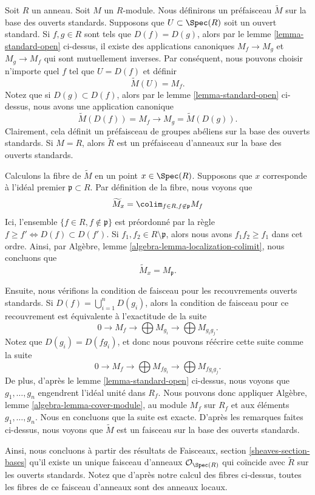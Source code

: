 \noindent
Soit $R$ un anneau. Soit $M$ un $R$-module. Nous définirons un préfaisceau
$\widetilde M$ sur la base des ouverts standards. Supposons que
$U \subset \Spec(R)$ soit un ouvert standard. Si $f, g \in R$
sont tels que $D(f) = D(g)$, alors par le lemme
\ref{lemma-standard-open} ci-dessus, il existe des applications canoniques $M_f
\to M_g$ et $M_g \to M_f$ qui sont mutuellement inverses. Par conséquent,
nous pouvons choisir n'importe quel $f$ tel que $U = D(f)$
et définir
$$
\widetilde M(U) = M_f.
$$
Notez que si $D(g) \subset D(f)$, alors par le lemme
\ref{lemma-standard-open} ci-dessus, nous avons une
application canonique
$$
\widetilde M(D(f)) = M_f \longrightarrow M_g = \widetilde M(D(g)).
$$
Clairement, cela définit un préfaisceau de groupes abéliens sur la base
des ouverts standards. Si $M = R$, alors $\widetilde R$ est un préfaisceau
d'anneaux sur la base des ouverts standards.

\medskip\noindent
Calculons la fibre de $\widetilde M$ en un point $x \in \Spec(R)$. Supposons
que $x$ corresponde à l'idéal premier $\mathfrak p \subset R$. Par
définition de la fibre, nous voyons que
$$
\widetilde M_x = \colim_{f\in R, f\not\in \mathfrak p} M_f
$$
Ici, l'ensemble $\{f \in R, f \not \in \mathfrak p\}$ est préordonné par
la règle $f \geq f' \Leftrightarrow D(f) \subset D(f')$.
Si $f_1, f_2 \in R \setminus \mathfrak p$, alors nous avons
$f_1f_2 \geq f_1$ dans cet ordre. Ainsi, par
Algèbre, lemme \ref{algebra-lemma-localization-colimit},
nous concluons que
$$
\widetilde M_x = M_{\mathfrak p}.
$$

\medskip\noindent
Ensuite, nous vérifions la condition de faisceau pour les recouvrements ouverts
standards. Si $D(f) = \bigcup_{i = 1}^n D(g_i)$, alors la condition
de faisceau pour ce recouvrement est équivalente à l’exactitude de
la suite
$$
0 \to M_f \to \bigoplus M_{g_i} \to \bigoplus M_{g_ig_j}.
$$
Notez que $D(g_i) = D(fg_i)$, et donc nous pouvons réécrire
cette suite comme la suite
$$
0 \to M_f \to \bigoplus M_{fg_i} \to \bigoplus M_{fg_ig_j}.
$$
De plus, d'après le lemme \ref{lemma-standard-open} ci-dessus,
nous voyons que $g_1, \ldots, g_n$ engendrent l'idéal unité
dans $R_f$. Nous pouvons donc
appliquer Algèbre, lemme \ref{algebra-lemma-cover-module},
au module $M_f$ sur $R_f$ et aux éléments $g_1, \ldots, g_n$. Nous en
concluons que la suite est exacte. D'après les remarques faites
ci-dessus, nous voyons que $\widetilde M$ est un faisceau
sur la base des ouverts standards.

\medskip\noindent
Ainsi, nous concluons à partir des résultats
de Faisceaux, section \ref{sheaves-section-bases}
qu'il existe un unique
faisceau d'anneaux $\mathcal{O}_{\Spec(R)}$ qui
coïncide avec $\widetilde R$ sur les ouverts standards. Notez que
d'après notre calcul des fibres ci-dessus, toutes les
fibres de ce faisceau d'anneaux sont des anneaux locaux.

